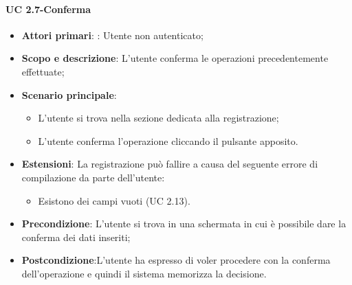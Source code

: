                 \paragraph{UC 2.7-Conferma}
            \begin{itemize}
                \item \textbf{Attori primari}: : Utente non autenticato;
                
                \item \textbf{Scopo e descrizione}: L'utente conferma le operazioni precedentemente effettuate; 
                \item \textbf{Scenario principale}:
                    \begin{itemize}
                        \item L'utente si trova nella sezione dedicata alla registrazione;
                        \item L'utente conferma l'operazione cliccando il pulsante apposito.
                    \end{itemize}
                \item \textbf{Estensioni}: La registrazione può fallire a causa del seguente errore di compilazione da parte dell'utente:
                \begin{itemize}
                \item Esistono dei campi vuoti (UC 2.13).
                \end{itemize}
                \item \textbf{Precondizione}: L'utente si trova in una schermata in cui è possibile dare la conferma
                dei dati inseriti;
                \item \textbf{Postcondizione}:L’utente ha espresso di voler procedere con la conferma dell'operazione e quindi il sistema memorizza la decisione.
            \end{itemize}
                
        
        
